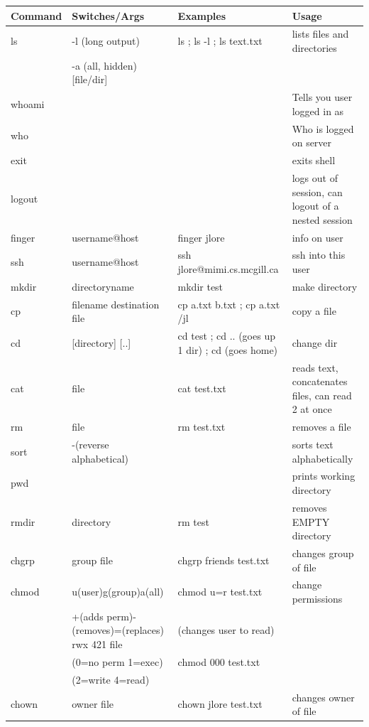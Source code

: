 \documentclass[12 pt]{article}
\begin{document}
	\begin{tabularx}{\textwidth}{|X|X|X|X|}
		\hline
		Command & Switches/Args & Examples & Usage
		\\\hline
		 ls & -l (long output) & ls ; ls -l ; ls text.txt & lists files and directories
		 \\ & -a (all, hidden) [file/dir] & &
		\\\hline
		 whoami &&& Tells you user logged in as
		 \\\hline
		 who &&& Who is logged on server
		 \\\hline
		 exit &&& exits shell
		 \\\hline 
		 logout &&& logs out of session, can logout of a nested session
		 \\\hline
		 finger & username@host & finger jlore & info on user
		 \\\hline
		 ssh & username@host & ssh jlore@mimi.cs.mcgill.ca & ssh into this user
		 \\\hline
		 mkdir & directoryname & mkdir test & make directory
		 \\\hline 
		 cp & filename destination file & cp a.txt b.txt ; cp a.txt /jl & copy a file
		 \\\hline
		 cd & [directory] [..] & cd test ; cd .. (goes up 1 dir) ; cd (goes home) & change dir
		 \\\hline
		 cat & file & cat test.txt & reads text, concatenates files, can read 2 at once
		 \\\hline
		 rm & file & rm test.txt & removes a file
		 \\\hline
		 sort & -(reverse alphabetical) && sorts text alphabetically
		 \\\hline
		 pwd & && prints working directory
		 \\\hline 
		 rmdir & directory & rm test & removes EMPTY directory
		 \\\hline 
		 chgrp & group file & chgrp friends test.txt & changes group of file
		 \\\hline
		 chmod & u(user)g(group)a(all) & chmod u=r test.txt & change permissions
		 \\ ~&  +(adds perm)-(removes)=(replaces) rwx 421 file &  (changes user to read) &
		 \\ &(0=no perm 1=exec) & chmod 000 test.txt&
		 \\ &(2=write 4=read)& &
		 \\\hline 
		 chown & owner file & chown jlore test.txt & changes owner of file

\end{tabularx}
\end{document}
